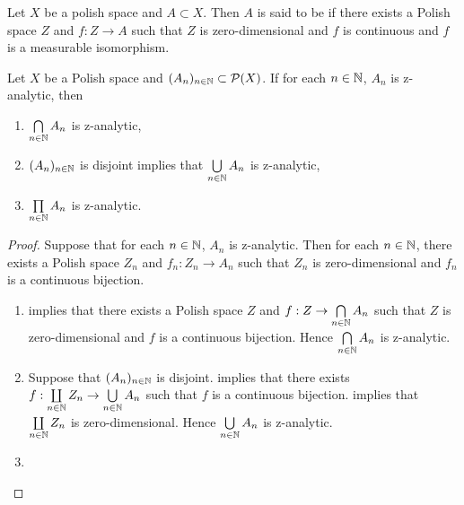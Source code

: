 \documentclass{book}
\begin{document}
	\begin{defn} 
		Let $X$ be a polish space and $A \subset X$. Then $A$ is said to be  if there exists a Polish space $Z$ and $f:Z \rightarrow A$ such that $Z$ is zero-dimensional and $f$ is continuous and $f$ is a measurable isomorphism. 
	\end{defn}
	
	\begin{ex} 
		Let $X$ be a Polish space and $(A_n)_{n \in \mathbb{N}} \subset \mathcal{P}(X)$. If for each $n \in \mathbb{N}$, $A_n$ is z-analytic, then 
		\begin{enumerate}
			\item $\bigcap\limits_{n \in \mathbb{N}} A_n$ is z-analytic,
			\item $(A_n)_{n \in \mathbb{N}}$ is disjoint implies that $\bigcup\limits_{n \in \mathbb{N}} A_n$ is z-analytic,
			\item $\prod\limits_{n \in \mathbb{N}} A_n$ is z-analytic.
		\end{enumerate}
	\end{ex}

	\begin{proof}
		Suppose that for each $n \in \mathbb{N}$, $A_n$ is z-analytic. Then for each $n \in \mathbb{N}$, there exists a Polish space $Z_n$ and $f_n: Z_n \rightarrow A_n$ such that $Z_n$ is zero-dimensional and $f_n$ is a continuous bijection. 
		\begin{enumerate}
			\item  {} implies that there exists a Polish space $Z$ and $f:Z \rightarrow \bigcap\limits_{n \in \mathbb{N}} A_n$ such that $Z$ is zero-dimensional and $f$ is a continuous bijection.  Hence $\bigcap\limits_{n \in \mathbb{N}} A_n$ is z-analytic.
			\item Suppose that $(A_n)_{n \in \mathbb{N}}$ is disjoint.  implies that there exists $f: \coprod\limits_{n \in \mathbb{N}} Z_n \rightarrow \bigcup\limits_{n \in \mathbb{N}} A_n$ such that $f$ is a continuous bijection.  implies that $\coprod\limits_{n \in \mathbb{N}} Z_n$ is zero-dimensional. Hence $\bigcup\limits_{n \in \mathbb{N}} A_n$ is z-analytic.
			\item {}
		\end{enumerate}
	\end{proof}
	
\end{document}

